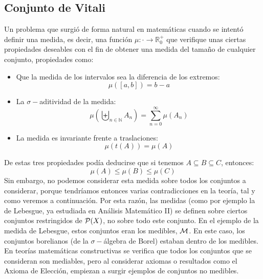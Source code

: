 \subsection{Conjunto de Vitali}
Un problema que surgió de forma natural en matemáticas cuando se intentó definir una medida, es decir, una función $\mu:\cdot \to \mathbb{R}^+_0$ que verifique unas ciertas propiedades deseables con el fin de obtener una medida del tamaño de cualquier conjunto, propiedades como: 
\begin{itemize}
    \item Que la medida de los intervalos sea la diferencia de los extremos:
        \begin{equation*}
            \mu([a,b]) = b-a
        \end{equation*}
    \item La $\sigma-$aditividad de la medida:
        \begin{equation*}
            \mu\left(\biguplus_{n\in \mathbb{N}}A_n\right) = \sum_{n=0}^{\infty} \mu(A_n)
        \end{equation*}
    \item La medida es invariante frente a traslaciones:
        \begin{equation*}
            \mu(t(A)) = \mu(A)
        \end{equation*}
\end{itemize}
De estas tres propiedades podía deducirse que si tenemos $A\subseteq B\subseteq C$, entonces:
\begin{equation*}
    \mu(A) \leq \mu(B) \leq \mu(C)
\end{equation*}
Sin embargo, no podemos considerar esta medida sobre todos los conjuntos a considerar, porque tendríamos entonces varias contradicciones en la teoría, tal y como veremos a continuación. Por esta razón, las medidas (como por ejemplo la de Lebesgue, ya estudiada en Análisis Matemático II) se definen sobre ciertos conjuntos restringidos de $\mathcal{P}(X)$, no sobre todo este conjunto. En el ejemplo de la medida de Lebesgue, estos conjuntos eran los medibles, $\mathcal{M}$. En este caso, los conjuntos borelianos (de la $\sigma-$álgebra de Borel) estaban dentro de los medibles.\\

En teorías matemáticas constructivas se verifica que todos los conjuntos que se consideran son mediables, pero al considerar axiomas o resultados como el Axioma de Elección, empiezan a surgir ejemplos de conjuntos no medibles.\\

